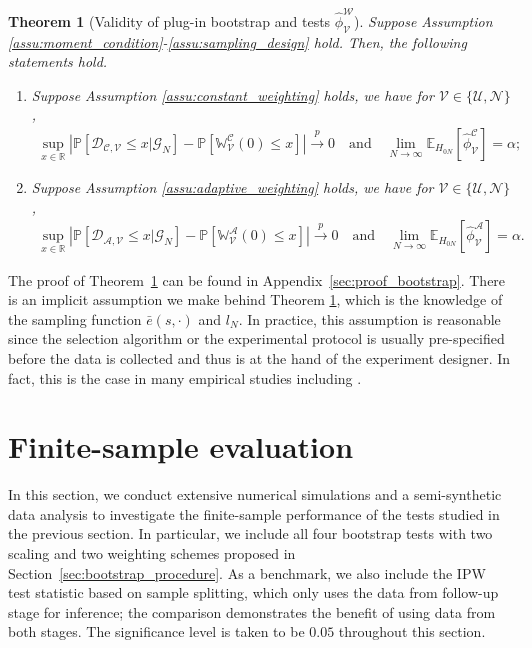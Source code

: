\documentclass[12pt]{article}
\newtheorem{theorem}{Theorem}
\def\P{\mathbb{P}}
\def\P{\mathbb{P}}
\newcommand{\E}{\mathbb E}								%
\renewcommand{\P}{\mathbb{P}}							%
\newcommand{\convp}{\overset p \rightarrow}             %
\begin{document}
\begin{theorem}[Validity of plug-in bootstrap and tests $\hat \phi_{\mathcal{V}}^{\mathcal{W}}$]\label{thm:bootstrap}
	Suppose Assumption \ref{assu:moment_condition}-\ref{assu:sampling_design} hold. Then, the following statements hold.
	\begin{enumerate}
		\item Suppose Assumption \ref{assu:constant_weighting} holds, we have for $\mathcal{V}\in \{\mathcal{U},\mathcal{N}\}$,
		\begin{align*}
			\sup_{x\in\mathbb{R}}\left|\P\left[\mathcal{D}_{\mathcal{C},\mathcal{V}}\leq x|\mathcal{G}_N\right]-\P[\mathbb{W}_\mathcal{V}^{\mathcal{C}}(0)\leq x]\right|\convp 0\quad\text{and}\quad\lim_{N\rightarrow\infty}\E_{H_{0N}}[\hat \phi_{\mathcal{V}}^{\mathcal{C}}]=\alpha;
		\end{align*}
		\item Suppose Assumption \ref{assu:adaptive_weighting} holds, we have for $\mathcal{V}\in \{\mathcal{U},\mathcal{N}\}$,
		\begin{align*}
			\sup_{x\in\mathbb{R}}\left|\P\left[\mathcal{D}_{\mathcal{A},\mathcal{V}}\leq x|\mathcal{G}_N\right]-\P[\mathbb{W}_\mathcal{V}^{\mathcal{A}}(0)\leq x]\right|\convp 0\quad\text{and}\quad\lim_{N\rightarrow\infty}\E_{H_{0N}}[\hat \phi_{\mathcal{V}}^{\mathcal{A}}]=\alpha.
		\end{align*}
	\end{enumerate}
\end{theorem}

The proof of Theorem~\ref{thm:bootstrap} can be found in Appendix~\ref{sec:proof_bootstrap}. 
There is an implicit assumption we make behind Theorem \ref{thm:bootstrap}, 
which is the knowledge of the sampling function $\bar e(s,\cdot)$ and $l_N$. In practice, this assumption is reasonable since the selection algorithm or the experimental protocol is usually pre-specified before the data is collected and thus is at the hand of the experiment designer. In fact, this is the case in many empirical studies including \citet{collins2007multiphase,li2010contextual,offer2021adaptive,hannah_a_jin_2023_8192805}.



\section{Finite-sample evaluation}\label{sec:finite-sample}

In this section, we conduct extensive numerical simulations and a semi-synthetic data analysis to investigate the finite-sample performance of the tests studied in the previous section. 
In particular, we include all four bootstrap tests with two scaling and two weighting schemes proposed in Section~\ref{sec:bootstrap_procedure}. 
As a benchmark, we also include the IPW test statistic based on sample splitting, which only uses the data from follow-up stage for inference; 
the comparison demonstrates the benefit of using data from both stages. The significance level is taken to be $0.05$ throughout this section.
\end{document}
